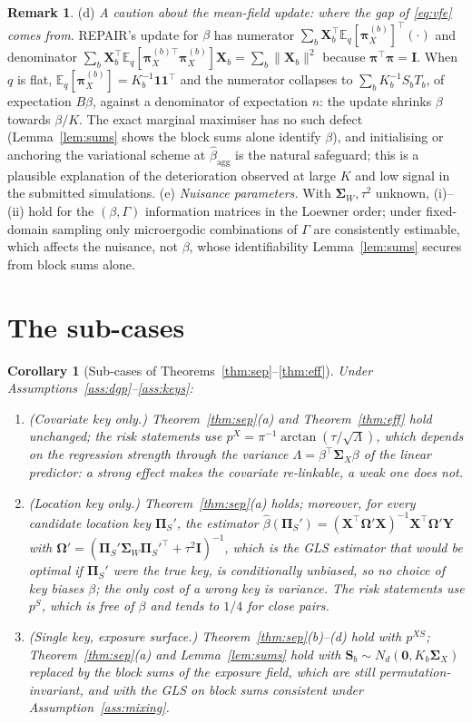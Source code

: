 \documentclass[11pt]{article}
\newtheorem{corollary}{Corollary}
\theoremstyle{definition}
\newtheorem{remark}{Remark}
\newcommand{\bX}{\mathbf{X}}
\newcommand{\bY}{\mathbf{Y}}
\newcommand{\bS}{\mathbf{S}}
\newcommand{\bI}{\mathbf{I}}
\newcommand{\bone}{\mathbf{1}}
\newcommand{\bzero}{\mathbf{0}}
\newcommand{\bSig}{\boldsymbol{\Sigma}}
\newcommand{\bOm}{\boldsymbol{\Omega}}
\newcommand{\bpi}{\boldsymbol{\pi}}
\newcommand{\bPi}{\boldsymbol{\Pi}}
\newcommand{\E}{\mathbb{E}}
\newcommand{\agg}{\mathrm{agg}}
\begin{document}
\begin{remark}
(d) \emph{A caution about the mean-field update: where the gap of \eqref{eq:vfe} comes from.} REPAIR's update for $\beta$ has numerator $\sum_b\bX_b^\top\E_q[\bpi_X^{(b)}]^\top(\cdot)$ and denominator $\sum_b\bX_b^\top\E_q[\bpi_X^{(b)\top}\bpi_X^{(b)}]\bX_b=\sum_b\|\bX_b\|^2$ because $\bpi^\top\bpi=\bI$. When $q$ is flat, $\E_q[\bpi_X^{(b)}]=K_b^{-1}\bone\bone^\top$ and the numerator collapses to $\sum_bK_b^{-1}S_bT_b$, of expectation $B\beta$, against a denominator of expectation $n$: the update shrinks $\beta$ towards $\beta/K$. The exact marginal maximiser has no such defect (Lemma~\ref{lem:sums} shows the block sums alone identify $\beta$), and initialising or anchoring the variational scheme at $\hat\beta_\agg$ is the natural safeguard; this is a plausible explanation of the deterioration observed at large $K$ and low signal in the submitted simulations.
(e) \emph{Nuisance parameters.} With $\bSig_W,\tau^2$ unknown, (i)--(ii) hold for the $(\beta,\Gamma)$ information matrices in the Loewner order; under fixed-domain sampling only microergodic combinations of $\Gamma$ are consistently estimable, which affects the nuisance, not $\beta$, whose identifiability Lemma~\ref{lem:sums} secures from block sums alone.
\end{remark}

\section{The sub-cases}\label{sec:subresults}

\begin{corollary}[Sub-cases of Theorems~\ref{thm:sep}--\ref{thm:eff}]\label{cor:sub}
Under Assumptions~\ref{ass:dgp}--\ref{ass:keys}:
\begin{enumerate}
\item[(i)] (Covariate key only.) Theorem~\ref{thm:sep}(a) and Theorem~\ref{thm:eff} hold unchanged; the risk statements use $p^X=\pi^{-1}\arctan(\tau/\sqrt\Lambda)$, which depends on the regression strength through the variance $\Lambda=\beta^\top\bSig_X\beta$ of the linear predictor: a strong effect makes the covariate re-linkable, a weak one does not.
\item[(ii)] (Location key only.) Theorem~\ref{thm:sep}(a) holds; moreover, for every candidate location key $\bPi_S'$, the estimator $\hat\beta(\bPi_S')=(\bX^\top\bOm'\bX)^{-1}\bX^\top\bOm'\bY$ with $\bOm'=(\bPi_S'\bSig_W\bPi_S'^\top+\tau^2\bI)^{-1}$, which is the GLS estimator that would be optimal if $\bPi_S'$ were the true key, is conditionally unbiased, so no choice of key biases $\beta$; the only cost of a wrong key is variance. The risk statements use $p^S$, which is free of $\beta$ and tends to $1/4$ for close pairs.
\item[(iii)] (Single key, exposure surface.) Theorem~\ref{thm:sep}(b)--(d) hold with $p^{XS}$; Theorem~\ref{thm:sep}(a) and Lemma~\ref{lem:sums} hold with $\bS_b\sim N_d(\bzero,K_b\bSig_X)$ replaced by the block sums of the exposure field, which are still permutation-invariant, and with the GLS on block sums consistent under Assumption~\ref{ass:mixing}.
\end{enumerate}
\end{corollary}
\end{document}
